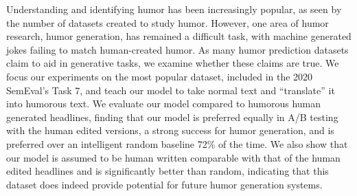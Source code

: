 Understanding and identifying humor has been increasingly popular, as seen by the number of datasets created to study humor.  However, one area of humor research, humor generation, has remained a difficult task, with machine generated jokes failing to match human-created humor.  As many humor prediction datasets claim to aid in generative tasks, we examine whether these claims are true.  We focus our experiments on the most popular dataset, included in the 2020 SemEval's Task 7, and teach our model to take normal text and ``translate'' it into humorous text.  We evaluate our model compared to humorous human generated headlines, finding that our model is preferred equally in A/B testing with the human edited versions, a strong success for humor generation, and is preferred over an intelligent random baseline 72\% of the time.  We also show that our model is assumed to be human written comparable with that of the human edited headlines and is significantly better than random, indicating that this dataset does indeed provide potential for future humor generation systems.
